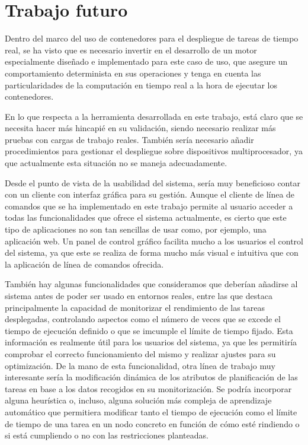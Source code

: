 \section{Trabajo futuro}

Dentro del marco del uso de contenedores para el despliegue de tareas de tiempo
real, se ha visto que es necesario invertir en el desarrollo de un motor
especialmente diseñado e implementado para este caso de uso, que asegure un
comportamiento determinista en sus operaciones y tenga en cuenta las
particularidades de la computación en tiempo real a la hora de ejecutar los
contenedores.

En lo que respecta a la herramienta desarrollada en este trabajo, está claro que
se necesita hacer más hincapié en su validación, siendo necesario realizar más
pruebas con cargas de trabajo reales. También sería necesario añadir
procedimientos para gestionar el despliegue sobre dispositivos multiprocesador,
ya que actualmente esta situación no se maneja adecuadamente.

Desde el punto de vista de la usabilidad del sistema, sería muy beneficioso
contar con un cliente con interfaz gráfica para su gestión. Aunque el cliente de
línea de comandos que se ha implementado en este trabajo permite al usuario
acceder a todas las funcionalidades que ofrece el sistema actualmente, es cierto
que este tipo de aplicaciones no son tan sencillas de usar como, por ejemplo,
una aplicación web. Un panel de control gráfico facilita mucho a los usuarios el
control del sistema, ya que este se realiza de forma mucho más visual e
intuitiva que con la aplicación de línea de comandos ofrecida.

También hay algunas funcionalidades que consideramos que deberían añadirse al
sistema antes de poder ser usado en entornos reales, entre las que destaca
principalmente la capacidad de monitorizar el rendimiento de las tareas
desplegadas, controlando aspectos como el número de veces que se excede el
tiempo de ejecución definido o que se imcumple el límite de tiempo fijado. Esta
información es realmente útil para los usuarios del sistema, ya que les
permitiría comprobar el correcto funcionamiento del mismo y realizar ajustes
para su optimización. De la mano de esta funcionalidad, otra línea de trabajo
muy interesante sería la modificación dinámica de los atributos de planificación
de las tareas en base a los datos recogidos en su monitorización. Se podría
incorporar alguna heurística o, incluso, alguna solución más compleja de
aprendizaje automático que permitiera modificar tanto el tiempo de ejecución
como el límite de tiempo de una tarea en un nodo concreto en función de cómo
esté rindiendo o si está cumpliendo o no con las restricciones planteadas.